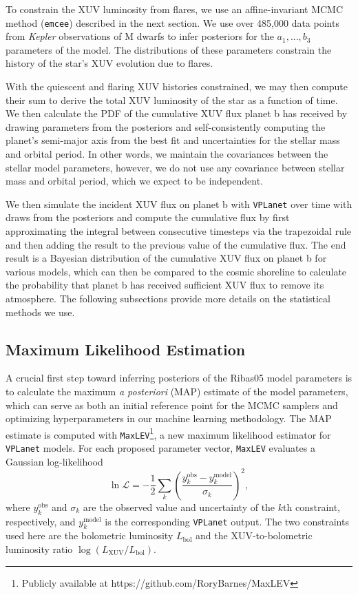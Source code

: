 \documentclass[preprint]{aastex631}
\def\kepler{{\it Kepler}\xspace}
\def\vplanet{\texttt{\footnotesize{VPLanet}}\xspace}
\def\emcee{\texttt{emcee}\xspace}
\begin{document}
To constrain the XUV luminosity from flares, we use an affine-invariant MCMC method (\emcee) described in the next section. We use over 485,000 data points from \kepler observations of M dwarfs \citep{Davenport19} to infer posteriors for the $a_1, ..., b_3$ parameters of the \citet{Davenport19} model. The distributions of these parameters constrain the history of the star's XUV evolution due to flares.

With the quiescent and flaring XUV histories constrained, we may then compute their sum to derive the total XUV luminosity of the star as a function of time. We then calculate the PDF of the cumulative XUV flux planet b has received by drawing parameters from the posteriors and self-consistently computing the planet's semi-major axis from the best fit and uncertainties for the stellar mass and orbital period. In other words, we maintain the covariances between the stellar model parameters, however, we do not use any covariance between stellar mass and orbital period, which we expect to be independent. 

We then simulate the incident XUV flux on planet b with \vplanet over time with draws from the posteriors and compute the cumulative flux by first approximating the integral between consecutive timesteps via the trapezoidal rule and then adding the result to the previous value of the cumulative flux. The end result is a Bayesian distribution of the cumulative XUV flux on planet b for various models, which can then be compared to the cosmic shoreline to calculate the probability that planet b has received sufficient XUV flux to remove its atmosphere. The following subsections provide more details on the statistical methods we use.

\subsection{Maximum Likelihood Estimation}

A crucial first step toward inferring posteriors of the Ribas05 model parameters is to calculate the  maximum \emph{a
posteriori} (MAP) estimate of the model parameters, which can serve as both an
initial reference point for the MCMC samplers and optimizing hyperparameters in our machine learning methodology. The MAP estimate is
computed with \texttt{MaxLEV}\footnote{Publicly available at https://github.com/RoryBarnes/MaxLEV}, a new maximum likelihood estimator for
\texttt{VPLanet} models. For each proposed parameter vector, \texttt{MaxLEV} 
evaluates a Gaussian log-likelihood
\begin{equation}
  \ln\mathcal{L} = -\frac{1}{2}\sum_{k}
  \left(\frac{y_{k}^{\mathrm{obs}} - y_{k}^{\mathrm{model}}}
  {\sigma_{k}}\right)^{2},
  \label{eq:loglike}
\end{equation}
where $y_{k}^{\mathrm{obs}}$ and $\sigma_{k}$ are the observed value
and uncertainty of the $k$th constraint, respectively, and
$y_{k}^{\mathrm{model}}$ is the corresponding \texttt{VPLanet} output.
The two constraints used here are the bolometric luminosity
$L_{\mathrm{bol}}$ and the XUV-to-bolometric luminosity ratio
$\log(L_{\mathrm{XUV}}/L_{\mathrm{bol}})$.
\end{document}
